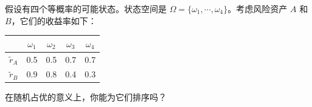 
\begin{problem}
 假设有四个等概率的可能状态。状态空间是 $\Omega=\{\omega_{1},\cdots,\omega_{4}\}$。考虑风险资产 $A$ 和 $B$，它们的收益率如下：
\begin{center}
\begin{tabular}{c|cccc}
    & $\omega_{1}$ & $\omega_{2}$ & $\omega_{3}$ & $\omega_{4}$ \\
    \hline
    $\tilde{r}_{A}$ & 0.5 & 0.5 & 0.7 & 0.7 \\
    $\tilde{r}_{B}$ & 0.9 & 0.8 & 0.4 & 0.3
\end{tabular}
\end{center}
在随机占优的意义上，你能为它们排序吗？
\end{problem}
